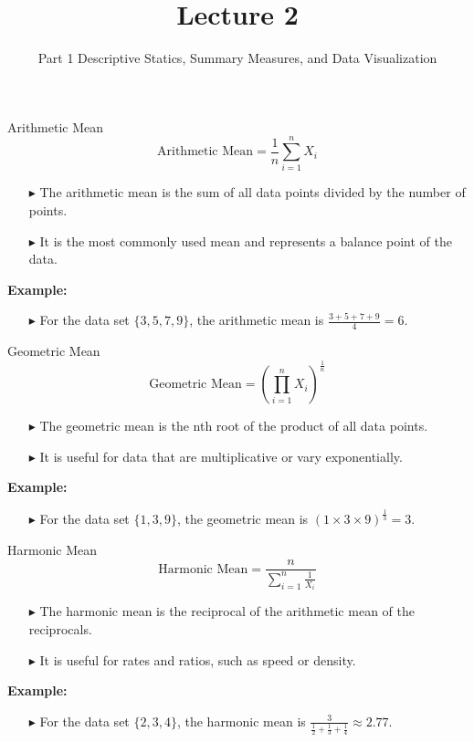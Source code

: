 \documentclass[12pt]{beamer}
\title[ECON2843]{Lecture 2}
\subtitle{Part 1 Descriptive Statics, Summary Measures, and Data Visualization}
\date{}
\begin{document}
\begin{frame}
	\titlepage
\end{frame}
	\begin{frame}{Arithmetic Mean}
		\[
		\text{Arithmetic Mean} = \frac{1}{n} \sum_{i=1}^{n} X_i
		\]
		\begin{itemize}
			\item[$\blacktriangleright$] The arithmetic mean is the sum of all data points divided by the number of points.
			\item[$\blacktriangleright$] It is the most commonly used mean and represents a balance point of the data.
		\end{itemize}
		\textbf{Example:}
		\begin{itemize}
			\item[$\blacktriangleright$] For the data set \( \{3, 5, 7, 9\} \), the arithmetic mean is \( \frac{3 + 5 + 7 + 9}{4} = 6 \).
		\end{itemize}
	\end{frame}
	\begin{frame}{Geometric Mean}
		\[
		\text{Geometric Mean} = \left( \prod_{i=1}^{n} X_i \right)^{\frac{1}{n}}
		\]
		\begin{itemize}
			\item[$\blacktriangleright$] The geometric mean is the nth root of the product of all data points.
			\item[$\blacktriangleright$] It is useful for data that are multiplicative or vary exponentially.
		\end{itemize}
		\textbf{Example:}
		\begin{itemize}
			\item[$\blacktriangleright$] For the data set \( \{1, 3, 9\} \), the geometric mean is \( (1 \times 3 \times 9)^{\frac{1}{3}} = 3 \).
		\end{itemize}
	\end{frame}
	\begin{frame}{Harmonic Mean}
		\[
		\text{Harmonic Mean} = \frac{n}{\sum_{i=1}^{n} \frac{1}{X_i}}
		\]
		\begin{itemize}
			\item[$\blacktriangleright$] The harmonic mean is the reciprocal of the arithmetic mean of the reciprocals.
			\item[$\blacktriangleright$] It is useful for rates and ratios, such as speed or density.
		\end{itemize}
		\textbf{Example:}
		\begin{itemize}
			\item[$\blacktriangleright$] For the data set \( \{2, 3, 4\} \), the harmonic mean is \( \frac{3}{\frac{1}{2} + \frac{1}{3} + \frac{1}{4}} \approx 2.77 \).
		\end{itemize}
	\end{frame}
\end{document}
